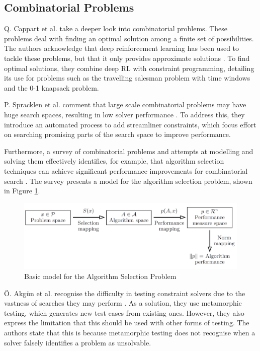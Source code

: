 \subsection{Combinatorial Problems}
Q. Cappart et al. take a deeper look into combinatorial problems. These problems deal with finding an optimal solution among a finite set of possibilities. The authors acknowledge that deep reinforcement learning has been used to tackle these problems, but that it only provides approximate solutions \cite{Combinatorics_CP_RL}. To find optimal solutions, they combine deep RL with constraint programming, detailing its use for problems such as the travelling salesman problem with time windows and the 0-1 knapsack problem.

P. Spracklen et al. comment that large scale combinatorial problems may have huge search spaces, resulting in low solver performance \cite{Combinatorics_Streamliner_Constraints}. To address this, they introduce an automated process to add streamliner constraints, which focus effort on searching promising parts of the search space to improve performance.

Furthermore, a survey of combinatorial problems and attempts at modelling and solving them effectively identifies, for example, that algorithm selection techniques can achieve significant performance improvements for combinatorial search \cite{Data_Mining_and_Constraint_Programming}. The survey presents a model for the algorithm selection problem, shown in Figure \ref{fig:algorithmSelection}.

\begin{figure}[H]
    \centering
    \includegraphics[width=\textwidth, height=0.3\textheight, keepaspectratio]{Images/AlgorithmSelection.png}
    \caption{Basic model for the Algorithm Selection Problem \cite{Data_Mining_and_Constraint_Programming}}
    \label{fig:algorithmSelection}
\end{figure}

Ö. Akgün et al. recognise the difficulty in testing constraint solvers due to the vastness of searches they may perform \cite{Metamorphic_Testing}. As a solution, they use metamorphic testing, which generates new test cases from existing ones. However, they also express the limitation that this should be used with other forms of testing. The authors state that this is because metamorphic testing does not recognise when a solver falsely identifies a problem as unsolvable.

